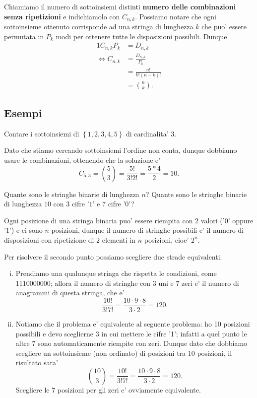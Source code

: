 Chiamiamo il numero di sottoinsiemi distinti \textbf{numero delle combinazioni senza ripetizioni} e indichiamolo con $C_{n, k}$. Possiamo notare che ogni sottoinsieme ottenuto corrisponde ad una stringa di lunghezza $k$ che puo' essere permutata in $P_k$ modi per ottenere tutte le disposizioni possibili. Dunque \begin{alignat*}
    {1}
    C_{n, k}P_k   &= D_{n, k}  \\
    \iff C_{n, k} &= \frac{D_{n,k}}{P_k}\\
                  &= \frac{n!}{k!(n-k)!} \\
                  &= \binom{n}{k}.
\end{alignat*}

\subsection{Esempi}

\begin{example}
    Contare i sottoinsiemi di $\left\{ 1, 2, 3, 4, 5\right\}$ di cardinalita' $3$.
\end{example}
\begin{solution}
    Dato che stiamo cercando sottoinsiemi l'ordine non conta, dunque dobbiamo usare le combinazioni, ottenendo che la soluzione e' \[
        C_{5, 3} = \binom{5}{3} =  \frac{5!}{3!2!} = \frac{5*4}{2} = 10
    .\]
\end{solution}

\begin{example}
    Quante sono le stringhe binarie di lunghezza $n$? Quante sono le stringhe binarie di lunghezza $10$ con $3$ cifre '$1$' e $7$ cifre '$0$'?
\end{example}
\begin{solution}
    Ogni posizione di una stringa binaria puo' essere riempita con $2$ valori ('0' oppure '1') e ci sono $n$ posizioni, dunque il numero di stringhe possibili e' il numero di disposizioni con ripetizione di $2$ elementi in $n$ posizioni, cioe' $2^n$.

    Per risolvere il secondo punto possiamo scegliere due strade equivalenti.
    \begin{enumerate}[(i)]
        \item Prendiamo una qualunque stringa che rispetta le condizioni, come 1110000000; allora il numero di stringhe con 3 uni e 7 zeri e' il numero di anagrammi di questa stringa, che e' \[
            \frac{10!}{3!7!} = \frac{10 \cdot 9 \cdot 8}{3 \cdot 2} = 120.   
        \]
        \item Notiamo che il problema e' equivalente al seguente problema: ho 10 posizioni possibili e devo sceglierne 3 in cui mettere le cifre '1'; infatti a quel punto le altre 7 sono automaticamente riempite con zeri. Dunque dato che dobbiamo scegliere un sottoinsieme (non ordinato) di posizioni tra 10 posizioni, il risultato sara' \[
            \binom{10}{3} = \frac{10!}{3!7!} = \frac{10 \cdot 9 \cdot 8}{3 \cdot 2} = 120.   
        \]
        Scegliere le 7 posizioni per gli zeri e' ovviamente equivalente.
    \end{enumerate}
\end{solution}

